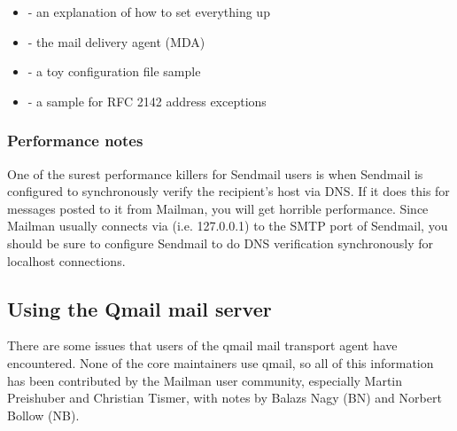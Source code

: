 \documentclass{howto}
\begin{document}
\begin{itemize}
\item {} - an explanation of how to set everything up
\item {}        - the mail delivery agent (MDA)
\item {}        - a toy configuration file sample
\item {}     - a sample for RFC 2142 address exceptions
\end{itemize}

\subsubsection{Performance notes}

One of the surest performance killers for Sendmail users is when Sendmail is
configured to synchronously verify the recipient's host via DNS.  If it does
this for messages posted to it from Mailman, you will get horrible
performance.  Since Mailman usually connects via 
(i.e. 127.0.0.1) to the SMTP port of Sendmail, you should be sure to configure
Sendmail to  do DNS verification synchronously for localhost
connections.

\subsection{Using the Qmail mail server\label{qmail-issues}}

There are some issues that users of the qmail mail transport agent have
encountered.  None of the core maintainers use qmail, so all of this
information has been contributed by the Mailman user community, especially
Martin Preishuber and Christian Tismer, with notes by Balazs Nagy (BN) and
Norbert Bollow (NB).
\end{document}
